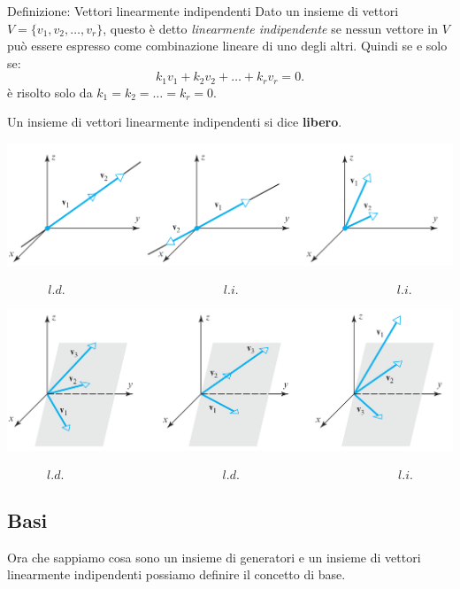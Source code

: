 \documentclass[x11names]{article}
\begin{document}
\begin{center}
\colorbox{myblue}{\begin{minipage}{5.75in}
\begin{blues}{Definizione: Vettori linearmente indipendenti}
Dato un insieme di vettori $V=\{v_1,v_2,\dots,v_{r}\}$, questo  è detto \textit{linearmente indipendente} se nessun vettore in $V$ può essere espresso come combinazione lineare di uno degli altri. Quindi se e solo se:
\[
k_1v_1 + k_2v_2 + \dots + k_rv_r = 0
.\] 
è risolto solo da $k_1 =k_2= \dots = k_r =0$.

Un insieme di vettori linearmente indipendenti si dice \textbf{libero}.
\end{blues}
\end{minipage}}        
\end{center}

\begin{center}
\includegraphics[scale=0.22]{figures/linind.png}
\end{center}
$$
\begin{array}{ccc}
	l.d.\qquad \qquad \qquad \qquad \qquad \qquad& l.i. & \qquad \qquad \qquad \qquad \qquad \qquad l.i. 
\end{array}
$$ 
\begin{center}
\includegraphics[scale=0.22]{figures/linind2.png}
\end{center}
$$
\begin{array}{ccc}
	l.d.\qquad \qquad \qquad \qquad \qquad \qquad& l.d. & \qquad \qquad \qquad \qquad \qquad \qquad l.i. 
\end{array}
$$

\subsection{Basi}
Ora che sappiamo cosa sono un insieme di generatori e un insieme di vettori linearmente indipendenti possiamo definire il concetto di base.
\end{document}
